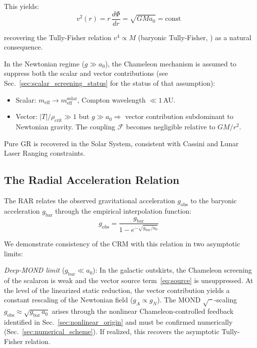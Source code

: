 \documentclass[aps,prd,twocolumn,superscriptaddress,nofootinbib]{revtex4-2}
\begin{document}
This yields:
\begin{equation}
v^2(r) = r\,\frac{d\Phi}{dr} = \sqrt{G M a_0} = \mathrm{const}
\end{equation}

recovering the Tully-Fisher relation $v^4 \propto M$ (baryonic Tully-Fisher, \cite{McGaugh2012}) as a natural consequence.

In the Newtonian regime ($g \gg a_0$), the Chameleon mechanism is assumed to suppress both the scalar and vector contributions (see Sec.~\ref{sec:scalar_screening_status} for the status of that assumption):
\begin{itemize}
\item Scalar: $m_{\mathrm{eff}} \to m_{\mathrm{eff}}^{\mathrm{solar}}$, Compton wavelength $\ll 1$\,AU.
\item Vector: $|T|/\rho_{\mathrm{crit}} \gg 1$ but $g \gg a_0 \Rightarrow$ vector contribution subdominant to Newtonian gravity. The coupling $\mathcal{F}$ becomes negligible relative to $GM/r^2$.
\end{itemize}

Pure GR is recovered in the Solar System, consistent with Cassini \cite{Bertotti2003} and Lunar Laser Ranging constraints.

\subsection{The Radial Acceleration Relation}
\label{sec:rar}

The RAR \cite{McGaugh2016} relates the observed gravitational acceleration $g_{\mathrm{obs}}$ to the baryonic acceleration $g_{\mathrm{bar}}$ through the empirical interpolation function:
\begin{equation}
g_{\mathrm{obs}} = \frac{g_{\mathrm{bar}}}{1 - e^{-\sqrt{g_{\mathrm{bar}}/a_0}}}
\label{eq:rar}
\end{equation}

We demonstrate consistency of the CRM with this relation in two asymptotic limits:

\textit{Deep-MOND limit} ($g_{\mathrm{bar}} \ll a_0$): In the galactic outskirts, the Chameleon screening of the scalaron is weak and the vector source term~\eqref{eq:source} is unsuppressed. At the level of the linearized static reduction, the vector contribution yields a constant rescaling of the Newtonian field ($g_A \propto g_N$). The MOND $\sqrt{\phantom{x}}$-scaling $g_{\mathrm{obs}} \approx \sqrt{g_{\mathrm{bar}}\,a_0}$ arises through the nonlinear Chameleon-controlled feedback identified in Sec.~\ref{sec:nonlinear_origin} and must be confirmed numerically (Sec.~\ref{sec:numerical_scheme}). If realized, this recovers the asymptotic Tully-Fisher relation.
\end{document}
